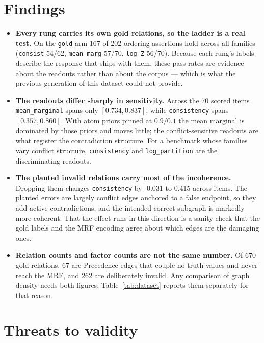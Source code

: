 \documentclass[11pt]{article}
\begin{document}
\section{Findings}

\begin{itemize}
\item \textbf{Every rung carries its own gold relations, so the ladder is a real test.} On the \texttt{gold} arm 167 of 202 ordering assertions hold across all families (\texttt{consist} 54/62, \texttt{mean-marg} 57/70, \texttt{log-Z} 56/70). Because each rung's labels describe the response that ships with them, these pass rates are evidence about the readouts rather than about the corpus --- which is what the previous generation of this dataset could not provide.
\item \textbf{The readouts differ sharply in sensitivity.} Across the 70 scored items \texttt{mean\_marginal} spans only $[0.734, 0.837]$, while \texttt{consistency} spans $[0.357, 0.860]$. With atom priors pinned at $0.9/0.1$ the mean marginal is dominated by those priors and moves little; the conflict-sensitive readouts are what register the contradiction structure. For a benchmark whose families vary conflict structure, \texttt{consistency} and \texttt{log\_partition} are the discriminating readouts.
\item \textbf{The planted invalid relations carry most of the incoherence.} Dropping them changes \texttt{consistency} by -0.031 to 0.415 across items. The planted errors are largely conflict edges anchored to a false endpoint, so they add active contradictions, and the intended-correct subgraph is markedly more coherent. That the effect runs in this direction is a sanity check that the gold labels and the MRF encoding agree about which edges are the damaging ones.
\item \textbf{Relation counts and factor counts are not the same number.} Of 670 gold relations, 67 are Precedence edges that couple no truth values and never reach the MRF, and 262 are deliberately invalid. Any comparison of graph density needs both figures; Table~\ref{tab:dataset} reports them separately for that reason.
\end{itemize}

\section{Threats to validity}
\end{document}
